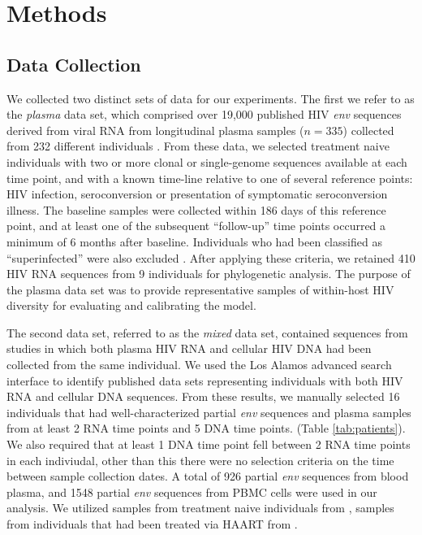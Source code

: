 \documentclass[12pt]{article}
\begin{document}

\section * {Methods} \label{sec:methods}



\subsection * {Data Collection} \label{subsec:dcollection}
We collected two distinct sets of data for our experiments. 
The first we refer to as the {\em plasma} data set, which comprised over 19,000 published HIV \textit{env} sequences derived from viral RNA from longitudinal plasma samples ($n=335$) collected from 232 different individuals \citep{McCloskey14}. 
From these data, we selected treatment naive individuals with two or more clonal or single-genome sequences available at each time point, and with a known time-line relative to one of several reference points: HIV infection, seroconversion or presentation of symptomatic seroconversion illness. 
The baseline samples were collected within 186 days of this reference point, and at least one of the subsequent ``follow-up'' time points occurred a minimum of 6 months after baseline.
Individuals who had been classified as ``superinfected'' were also excluded \citep{McCloskey14}.
After applying these criteria, we retained 410 HIV RNA sequences from 9 individuals for phylogenetic analysis.
The purpose of the plasma data set was to provide representative samples of within-host HIV diversity for evaluating and calibrating the model.

The second data set, referred to as the {\em mixed} data set, contained sequences from studies in which both plasma HIV RNA and cellular HIV DNA had been collected from the same individual.
We used the Los Alamos advanced search interface \citep{LosAlamos} to identify published data sets representing individuals with both HIV RNA and cellular DNA sequences.
From these results, we manually selected 16 individuals that had well-characterized partial {\em env} sequences and plasma samples from at least 2 RNA time points and 5 DNA time points. (Table \ref{tab:patients}). 
We also required that at least 1 DNA time point fell between 2 RNA time points in each indiviudal, other than this there were no selection criteria on the time between sample collection dates. 
A total of 926 partial {\em env} sequences from blood plasma, and 1548 partial {\em env} sequences from PBMC cells were used in our analysis. 
We utilized samples from treatment naive individuals from \cite{Shankarappa99, Novitsky09}, samples from individuals that had been treated via HAART from \cite{Llewellyn06}.
\end{document}

